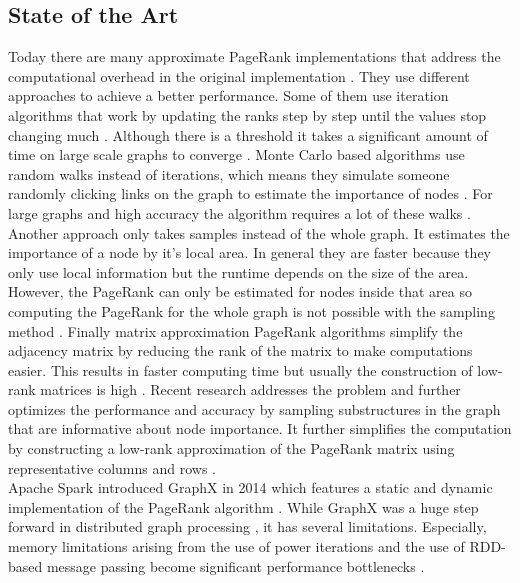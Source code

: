 \documentclass[a4paper,12pt]{article}
\begin{document}
\begin{multicols}{2}
\section{State of the Art}
Today there are many approximate PageRank implementations that address the computational overhead in the original implementation \cite{wu_efficient_2024}. They use different approaches to achieve a better performance. Some of them use iteration algorithms that work by updating the ranks step by step until the values stop changing much \cite{xie_parameterized_2023}\cite{anikin_efficient_2022}. Although there is a threshold it takes a significant amount of time on large scale graphs to converge \cite{wu_efficient_2024}. Monte Carlo based algorithms use random walks instead of iterations, which means they simulate someone randomly clicking links on the graph to estimate the importance of nodes . For large graphs and high accuracy the algorithm requires a lot of these walks \cite{breyer_markovian_nodate}\cite{noauthor_pdf_2024}. Another approach only takes samples instead of the whole graph. It estimates the importance of a node by it's local area. In general they are faster because they only use local information but the runtime depends on the size of the area. However, the PageRank can only be estimated for nodes inside that area so computing the PageRank for the whole graph is not possible with the sampling method \cite{wu_approxrank_2009}\cite{noauthor_local_nodate}. Finally matrix approximation PageRank algorithms simplify the adjacency matrix by reducing the rank of the matrix to make computations easier. This results in faster computing time but usually the construction of low-rank matrices is high \cite{noauthor_fast_nodate}. Recent research addresses the problem and further optimizes the performance and accuracy by sampling substructures in the graph that are informative about node importance. It further simplifies the computation by constructing a low-rank approximation of the PageRank matrix using representative columns and rows \cite{wu_efficient_2024}. \\Apache Spark introduced GraphX in 2014 which features a static and dynamic implementation of the PageRank algorithm \cite{noauthor_graphx_nodate}. While GraphX was a huge step forward in distributed graph processing \cite{gonzalez_graphx_nodate}, it has several limitations. %
Especially, memory limitations arising from the use of power iterations \cite{page_pagerank_1999} and the use of RDD-based message passing become significant performance bottlenecks \cite{xin_graphx_2014}\cite{xin_graphx_2013}.
 


\end{multicols}
\end{document}
